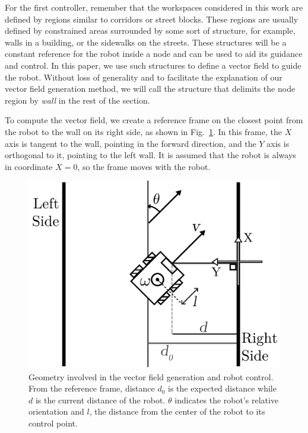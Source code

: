 \documentclass[smallcondensed]{svjour3}
\begin{document}
For the first controller, remember that the workspaces considered in this work are defined by regions similar to corridors or street blocks. These regions are usually defined by constrained areas surrounded by some sort of structure, for example, walls in a building, or the sidewalks on the streets. These structures will be a constant reference for the robot inside a node and can be used to aid its guidance and control. In this paper, we use such structures to define a vector field to guide the robot. Without loss of generality and to facilitate the explanation of our vector field generation method, we will call the structure that delimits the node region by \emph{wall} in the rest of the section.

To compute the vector field, we create a reference frame on the closest point from the robot to the wall on its right side, as shown in Fig.~\ref{fig:navigation}. In this frame, the $X$ axis is tangent to the wall, pointing in the forward direction, and the $Y$ axis is orthogonal to it, pointing to the left wall. It is assumed that the robot is always in coordinate $X=0$, so the frame moves with the robot.

\begin{figure}[h]
	\centering
	\includegraphics[width=0.8\linewidth]{Figures/Fig9.pdf}
	\caption{Geometry involved in the vector field generation and robot control. From the reference frame, distance ${d_\text{0}}$ is the expected distance while ${d}$ is the current distance of the robot. $\theta$ indicates the robot's relative orientation and $l$, the distance from the center of the robot to its control point.}
	\label{fig:navigation}
\end{figure}
\end{document}
